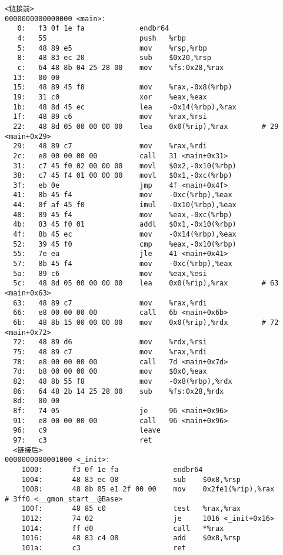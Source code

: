 \documentclass[UTF8,a4paper,10pt]{ctexart}
\begin{document}
\begin{lstlisting}[title=链接前后汇编代码对比,frame=trbl]
<链接前>
0000000000000000 <main>:
   0:   f3 0f 1e fa             endbr64
   4:   55                      push   %rbp
   5:   48 89 e5                mov    %rsp,%rbp
   8:   48 83 ec 20             sub    $0x20,%rsp
   c:   64 48 8b 04 25 28 00    mov    %fs:0x28,%rax
  13:   00 00 
  15:   48 89 45 f8             mov    %rax,-0x8(%rbp)
  19:   31 c0                   xor    %eax,%eax
  1b:   48 8d 45 ec             lea    -0x14(%rbp),%rax
  1f:   48 89 c6                mov    %rax,%rsi
  22:   48 8d 05 00 00 00 00    lea    0x0(%rip),%rax        # 29 <main+0x29>
  29:   48 89 c7                mov    %rax,%rdi
  2c:   e8 00 00 00 00          call   31 <main+0x31>
  31:   c7 45 f0 02 00 00 00    movl   $0x2,-0x10(%rbp)
  38:   c7 45 f4 01 00 00 00    movl   $0x1,-0xc(%rbp)
  3f:   eb 0e                   jmp    4f <main+0x4f>
  41:   8b 45 f4                mov    -0xc(%rbp),%eax
  44:   0f af 45 f0             imul   -0x10(%rbp),%eax
  48:   89 45 f4                mov    %eax,-0xc(%rbp)
  4b:   83 45 f0 01             addl   $0x1,-0x10(%rbp)
  4f:   8b 45 ec                mov    -0x14(%rbp),%eax
  52:   39 45 f0                cmp    %eax,-0x10(%rbp)
  55:   7e ea                   jle    41 <main+0x41>
  57:   8b 45 f4                mov    -0xc(%rbp),%eax
  5a:   89 c6                   mov    %eax,%esi
  5c:   48 8d 05 00 00 00 00    lea    0x0(%rip),%rax        # 63 <main+0x63>
  63:   48 89 c7                mov    %rax,%rdi
  66:   e8 00 00 00 00          call   6b <main+0x6b>
  6b:   48 8b 15 00 00 00 00    mov    0x0(%rip),%rdx        # 72 <main+0x72>
  72:   48 89 d6                mov    %rdx,%rsi
  75:   48 89 c7                mov    %rax,%rdi
  78:   e8 00 00 00 00          call   7d <main+0x7d>
  7d:   b8 00 00 00 00          mov    $0x0,%eax
  82:   48 8b 55 f8             mov    -0x8(%rbp),%rdx
  86:   64 48 2b 14 25 28 00    sub    %fs:0x28,%rdx
  8d:   00 00 
  8f:   74 05                   je     96 <main+0x96>
  91:   e8 00 00 00 00          call   96 <main+0x96>
  96:   c9                      leave
  97:   c3                      ret
  <链接后>
0000000000001000 <_init>:
    1000:       f3 0f 1e fa             endbr64
    1004:       48 83 ec 08             sub    $0x8,%rsp
    1008:       48 8b 05 e1 2f 00 00    mov    0x2fe1(%rip),%rax        # 3ff0 <__gmon_start__@Base>
    100f:       48 85 c0                test   %rax,%rax
    1012:       74 02                   je     1016 <_init+0x16>
    1014:       ff d0                   call   *%rax
    1016:       48 83 c4 08             add    $0x8,%rsp
    101a:       c3                      ret


\end{lstlisting}
\end{document}

